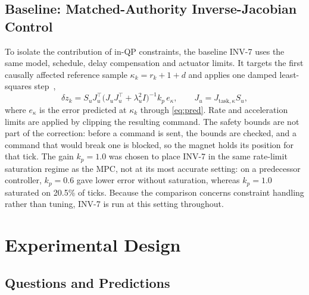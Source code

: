 \documentclass[journal]{IEEEtran}
\begin{document}
\subsection{Baseline: Matched-Authority Inverse-Jacobian Control}
\label{sec:inv7}

To isolate the contribution of in-QP constraints, the baseline INV-7
uses the same model, schedule, delay compensation and actuator limits.
 It targets the first causally affected
reference sample $\kappa_k=r_k+1+d$ and applies one damped least-squares
step~\cite{nakamura1986inverse,wampler1986manipulator,chiaverini1994review},
\begin{equation}
\delta z_k=S_uJ_u^\top\big(J_uJ_u^\top+\lambda_u^2I\big)^{-1}k_p\,e_{\kappa},
\qquad J_u=J_{\mathrm{task},\kappa}S_u,
\label{eq:inv7}
\end{equation}
where $e_\kappa$ is the error predicted at $\kappa_k$ through
\eqref{eq:pred}. Rate and acceleration limits are applied by clipping the
resulting command. The safety bounds are not part of the correction:
before a command is sent, the bounds are checked, and a command that would
break one is blocked, so the magnet holds its position for that tick. The
gain $k_p=1.0$ was chosen to place INV-7 in the same rate-limit saturation
regime as the MPC, not at its most accurate setting: on a predecessor
controller, $k_p=0.6$ gave lower error without saturation, whereas
$k_p=1.0$ saturated on 20.5\% of ticks. Because the comparison concerns
constraint handling rather than tuning, INV-7 is run at this setting
throughout. %

\section{Experimental Design}
\label{sec:experiments}

\subsection{Questions and Predictions}
\label{sec:questions}
\end{document}
